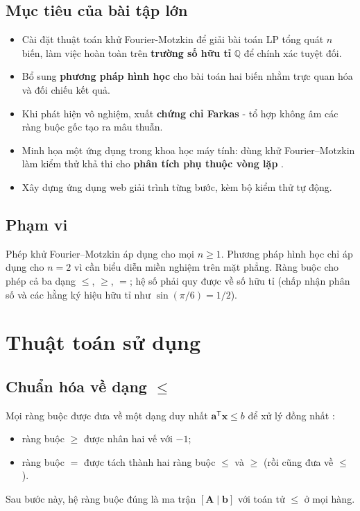 \documentclass[12pt,a4paper]{article}
\theoremstyle{definition}
\newcommand{\Q}{\mathbb{Q}}
\newcommand{\vx}{\mathbf{x}}
\newcommand{\vb}{\mathbf{b}}
\newcommand{\mA}{\mathbf{A}}
\newcommand{\T}{^{\mathsf T}}
\begin{document}
\subsection{Mục tiêu của bài tập lớn}

\begin{itemize}[leftmargin=1.4cm]
    \item Cài đặt thuật toán khử Fourier-Motzkin để giải bài toán LP tổng quát
          $n$ biến, làm việc hoàn toàn trên \textbf{trường số hữu tỉ} $\Q$ để
          chính xác tuyệt đối.
    \item Bổ sung \textbf{phương pháp hình học} cho bài toán hai biến nhằm trực
          quan hóa và đối chiếu kết quả.
    \item Khi phát hiện vô nghiệm, xuất \textbf{chứng chỉ Farkas} - tổ hợp không
          âm các ràng buộc gốc tạo ra mâu thuẫn.
    \item Minh họa một ứng dụng trong khoa học máy tính: dùng khử
          Fourier--Motzkin làm kiểm thử khả thi cho \textbf{phân tích phụ thuộc
          vòng lặp} \cite{allen2002}.
    \item Xây dựng ứng dụng web giải trình từng bước, kèm bộ kiểm thử tự động.
\end{itemize}

\subsection{Phạm vi}

Phép khử Fourier--Motzkin áp dụng cho mọi $n \ge 1$. Phương pháp hình học chỉ
áp dụng cho $n = 2$ vì cần biểu diễn miền nghiệm trên mặt phẳng. Ràng buộc cho
phép cả ba dạng $\le$, $\ge$, $=$; hệ số phải quy được về số hữu tỉ (chấp nhận
phân số và các hằng ký hiệu hữu tỉ như $\sin(\pi/6) = 1/2$).

\section{Thuật toán sử dụng}

\subsection{Chuẩn hóa về dạng \texorpdfstring{$\le$}{<=}}

Mọi ràng buộc được đưa về một dạng duy nhất $\mathbf{a}\T\vx \le b$ để xử lý
đồng nhất \cite{vanderbei2014}:
\begin{itemize}
    \item ràng buộc $\ge$ được nhân hai vế với $-1$;
    \item ràng buộc $=$ được tách thành hai ràng buộc $\le$ và $\ge$ (rồi cũng
          đưa về $\le$).
\end{itemize}
Sau bước này, hệ ràng buộc đúng là ma trận $[\mA \mid \vb]$ với toán tử $\le$
ở mọi hàng.
\end{document}

